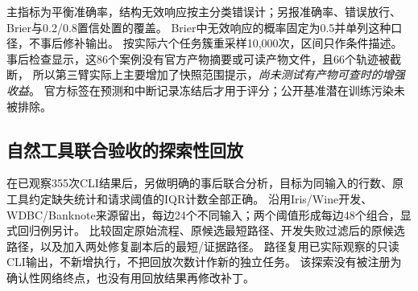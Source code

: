 主指标为平衡准确率，结构无效响应按主分类错误计；另报准确率、错误放行、Brier与0.2/0.8置信处置的覆盖。
Brier中无效响应的概率固定为0.5并单列这种口径，不事后修补输出。
按实际六个任务簇重采样10,000次，区间只作条件描述。
事后检查显示，这86个案例没有官方产物摘要或可读产物文件，且66个轨迹被截断，
所以第三臂实际上主要增加了快照范围提示，\emph{尚未测试有产物可查时的增强收益}。
官方标签在预测和中断记录冻结后才用于评分；公开基准潜在训练污染未被排除。

\subsection{自然工具联合验收的探索性回放}
在已观察355次CLI结果后，另做明确的事后联合分析，目标为同输入的行数、原工具约定缺失统计和请求阈值的IQR计数全部正确。
沿用Iris/Wine开发、WDBC/Banknote来源留出，每边24个不同输入；两个阈值形成每边48个组合，显式回归例另计。
比较固定原始流程、原候选最短路径、开发失败过滤后的原候选路径，以及加入两处修复副本后的最短/证据路径。
路径复用已实际观察的只读CLI输出，不新增执行，不把回放次数计作新的独立任务。
该探索没有被注册为确认性网络终点，也没有用回放结果再修改补丁。
